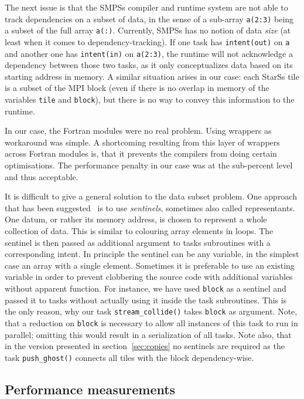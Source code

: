 \documentclass[conference]{IEEEtran}
\newcommand{\starss}{{StarSs}}
\newcommand{\smpss}{{SMPSs}}
\begin{document}
The next issue is that the \smpss{} compiler and runtime system are
not able to track dependencies on a subset of data, in the sense of a
sub-array \verb!a(2:3)!  being a subset of the full array
\verb!a(:)!. Currently, \smpss{} has no notion of data {\em
  size} (at least when it comes to dependency-tracking). 
If one task has \verb!intent(out)! on \verb!a! and another
one has \verb!intent(in)! on \verb!a(2:3)!, the runtime will not
acknowledge a dependency between those two tasks, as it only
conceptualizes data based on its starting address in memory. A similar
situation arises in our case: each \starss{} tile is a subset of the
MPI block (even if there is no overlap in memory of the variables
\verb!tile! and \verb!block!), but there is no way to convey this
information to the runtime.

In our case, the Fortran modules were no real problem. Using wrappers
as workaround was simple.  A shortcoming resulting from this layer of
wrappers across Fortran modules is, that it prevents the
compilers from doing certain optimisations. The performance penalty in our
case was at the sub-percent level and thus acceptable.

It is difficult to give a general solution to the data subset
problem. One approach that has been suggested~\cite{*Ss:PBL08} is to
use {\em sentinels}, sometimes also called representants. One datum,
or rather its memory address, is chosen to represent a whole
collection of data. This is similar to colouring array elements in
loops. The sentinel is then passed as additional argument to tasks
subroutines with a corresponding intent. In principle the sentinel can
be any variable, in the simplest case an array with a single
element. Sometimes it is preferable to use an existing variable in
order to prevent clobbering the source code with additional variables without
apparent function. For instance, we have used \verb!block! as a
sentinel and passed it to tasks without actually using it inside the
task subroutines. This is the only reason, why our task
\verb!stream_collide()! takes \verb!block! as
argument.
Note, that a
reduction on \verb!block! is necessary to allow all instances of this
task to run in parallel; omitting this would result in a serialization
of all tasks. Note also, that in the version presented in
section~\ref{sec:copies} no sentinels are required as the task
\verb!push_ghost()! connects all tiles with the block dependency-wise.


\subsection{Performance measurements}
\label{sec:performance}
\end{document}
